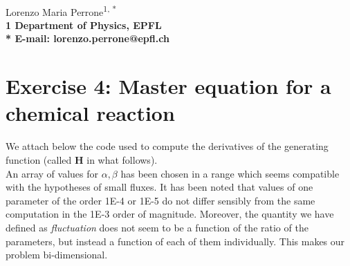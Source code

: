 \documentclass[11pt,letterpaper]{article}
\begin{document}
\vspace*{0.30in}

\begin{flushleft}
{\Large
\textbf{}
}
\newline
\\
Lorenzo Maria Perrone\textsuperscript{1, *}
\\
\bf{1} Department of Physics, EPFL
\\

% 
%





* E-mail: lorenzo.perrone@epfl.ch
\end{flushleft}


\section{Exercise 4: Master equation for a chemical reaction}

We attach below the code used to compute the derivatives of the generating function (called \textbf{H} in what follows).\\
An array of values for $\alpha, \beta$ has been chosen in a range which seems compatible with the hypotheses of small fluxes. It has been noted that values of one parameter of the order 1E-4 or 1E-5 do not differ sensibly from the same computation in the 1E-3 order of magnitude. Moreover, the quantity we have defined as \textit{fluctuation} does not seem to be a function of the ratio of the parameters, but instead a function of each of them individually. This makes our problem bi-dimensional.\\
\end{document}

